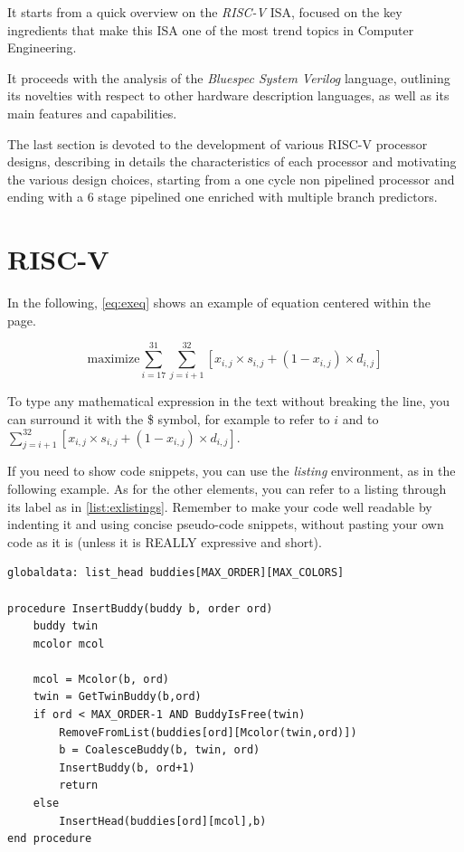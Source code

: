 \documentclass[12pt,oneside,a4paper]{article}
\begin{document}
It starts from a quick overview on the \textit{RISC-V} ISA, focused on the key ingredients that make this ISA one of the most trend topics in Computer Engineering.

It proceeds with the analysis of the \textit{Bluespec System Verilog} language, outlining its novelties with respect to other hardware description languages, as well as its main features and capabilities. 

The last section is devoted to the development of various RISC-V processor designs, describing in details the characteristics of each processor and motivating the various design choices, starting from a one cycle non pipelined processor and ending with a 6 stage pipelined one enriched with multiple branch predictors. 


\section{RISC-V} \label{sec:sec1}
In the following, \cref{eq:exeq} shows an example of equation centered within the page.

\begin{equation}\label{eq:exeq}
%
\mbox{maximize} \sum_{i=17}^{31} \sum_{j=i+1}^{32} [ x_{i,j} \times s_{i,j} + (1 - x_{i,j}) \times d_{i,j} ]
%
\end{equation}

To type any mathematical expression in the text without breaking the line, you can surround it with the \$ symbol, for example to refer to $i$ and to $ \sum_{j=i+1}^{32} [ x_{i,j} \times s_{i,j} + (1 - x_{i,j}) \times d_{i,j} ] $.

If you need to show code snippets, you can use the \emph{listing} environment, as in the following example. As for the other elements, you can refer to a listing through its label as in \cref{list:exlistings}. Remember to make your code well readable by indenting it and using concise pseudo-code snippets, without pasting your own code as it is (unless it is REALLY expressive and short).

\begin{lstlisting}[label={list:exlistings},caption={Example of code snippet}]
globaldata: list_head buddies[MAX_ORDER][MAX_COLORS]

procedure InsertBuddy(buddy b, order ord)
	buddy twin
	mcolor mcol
	
	mcol = Mcolor(b, ord)
	twin = GetTwinBuddy(b,ord)	
	if ord < MAX_ORDER-1 AND BuddyIsFree(twin)
		RemoveFromList(buddies[ord][Mcolor(twin,ord)])
		b = CoalesceBuddy(b, twin, ord)
		InsertBuddy(b, ord+1)
		return
	else
		InsertHead(buddies[ord][mcol],b)
end procedure
\end{lstlisting}
\end{document}
